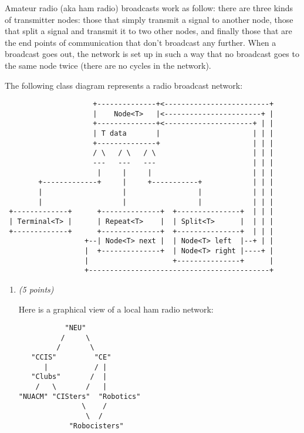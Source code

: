 \documentclass[11pt]{article}
\def\pts#1{\marginpar{\footnotesize \raggedright  \fbox{#1 {\sc Points}}}}
\newcounter{Pctr}
\newenvironment{problem}{\stepcounter{Pctr}%
\begin{description}
\item[\noindent{\bf Problem} \arabic{Pctr}] 
\end{description}}{\relax}
\begin{document}
\vfill\thispagestyle{empty}
\newpage

\pts{34}
\begin{problem}
Amateur radio (aka ham radio) broadcasts work as follow: there are
three kinds of transmitter nodes: those that simply transmit a signal
to another node, those that split a signal and transmit it to two
other nodes, and finally those that are the end points of
communication that don't broadcast any further.  When a broadcast goes
out, the network is set up in such a way that no broadcast goes to the
same node twice (there are no cycles in the network).

The following class diagram represents a radio broadcast network:

\begin{verbatim}
                     +--------------+<-------------------------+
                     |    Node<T>   |<-----------------------+ |
                     +--------------+<---------------------+ | |
                     | T data       |                      | | |
                     +--------------+                      | | |
                     / \   / \   / \                       | | |
                     ---   ---   ---                       | | |
                      |     |     |                        | | |
        +-------------+     |     +-----------+            | | |
        |                   |                 |            | | |
        |                   |                 |            | | |
 +-------------+      +--------------+  +---------------+  | | |
 | Terminal<T> |      | Repeat<T>    |  | Split<T>      |  | | |
 +-------------+      +--------------+  +---------------+  | | |
                   +--| Node<T> next |  | Node<T> left  |--+ | |
                   |  +--------------+  | Node<T> right |----+ |
                   |                    +---------------+      |
                   +-------------------------------------------+
\end{verbatim}


\begin{enumerate}


\newpage
\item {\em{(5 points)}}

Here is a graphical view of a local ham radio network:

\begin{verbatim}
           "NEU"
          /     \
         /       \
   "CCIS"         "CE"
      |           / |
   "Clubs"       /  |
    /   \       /   |
"NUACM" "CISters"  "Robotics"
               \    /
                \  /
            "Robocisters"
\end{verbatim}


\end{enumerate}
\end{problem}
\end{document}
